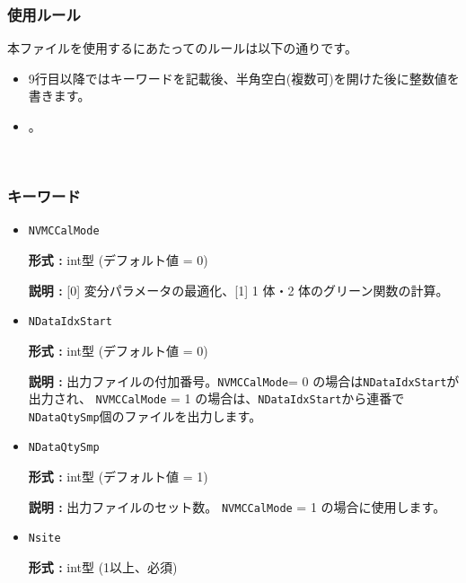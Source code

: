 \subsubsection{使用ルール}
本ファイルを使用するにあたってのルールは以下の通りです。
\begin{itemize}
\item 9行目以降ではキーワードを記載後、半角空白(複数可)を開けた後に整数値を書きます。
\item {}。
\end{itemize}

~\subsubsection{キーワード}
 \begin{itemize}
 
 \item  \verb|NVMCCalMode|

 {\bf 形式 :} int型 (デフォルト値 = 0)

{\bf 説明 :} [0] 変分パラメータの最適化、[1] 1 体・2 体のグリーン関数の計算。
 


 
 \item  \verb|NDataIdxStart|

 {\bf 形式 :} int型 (デフォルト値 = 0)

{\bf 説明 :} 出力ファイルの付加番号。\verb|NVMCCalMode|= 0 の場合は\verb|NDataIdxStart|が出力され、 \verb|NVMCCalMode| = 1 の場合は、\verb|NDataIdxStart|から連番で\verb|NDataQtySmp|個のファイルを出力します。
   
 \item  \verb|NDataQtySmp|

 {\bf 形式 :} int型 (デフォルト値 = 1)

{\bf 説明 :} 出力ファイルのセット数。 \verb|NVMCCalMode| = 1 の場合に使用します。

 \item  \verb|Nsite|

{\bf 形式 :} int型 (1以上、必須)


\end{itemize}
